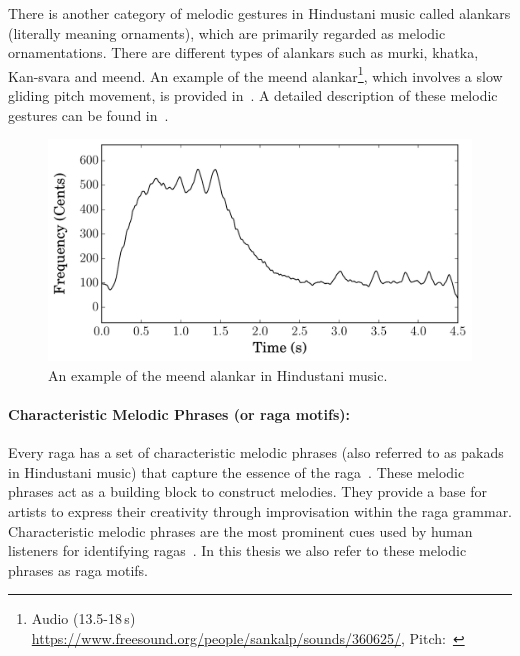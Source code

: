 There is another category of melodic gestures in Hindustani music called \glspl{alankar} (literally meaning ornaments), which are primarily regarded as melodic ornamentations. There are different types of \glspl{alankar} such as \gls{murki}, \gls{khatka}, Kan-\gls{svara} and \gls{meend}. An example of the \gls{meend} \gls{alankar}\footnote{Audio (13.5-18\,s) \url{https://www.freesound.org/people/sankalp/sounds/360625/}, Pitch:~}, which involves a slow gliding pitch movement, is provided in~. A detailed description of these melodic gestures can be found in~\cite{Bagchee1998}.

\begin{figure}
	\begin{center}
		\includegraphics[width=\figSizeEighty]{ch02_background/figures/DemoAlankar_13_5__18.pdf}
	\end{center}
	\caption[An example of the \gls{meend} \gls{alankar} in Hindustani music]{An example of the \gls{meend} \gls{alankar} in Hindustani music.}
	\label{fig:meend_todi}
\end{figure}


\paragraph{Characteristic Melodic Phrases (or \gls{raga} motifs):} Every \gls{raga} has a set of characteristic melodic phrases (also referred to as pakads in Hindustani music) that capture the essence of the \gls{raga}~\citep{Bagchee1998,rao1999raga,Viswanathan2004}. These melodic phrases act as a building block to construct melodies. They provide a base for artists to express their creativity through improvisation within the \gls{raga} grammar. Characteristic melodic phrases are the most prominent cues used by human listeners for identifying \glspl{raga}~\citep{krishna2012carnatic,Suvarnalata2014}. In this thesis we also refer to these melodic phrases as \gls{raga} motifs.

